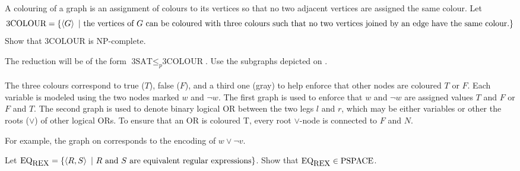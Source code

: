 \documentclass{article}
\begin{document}
\begin{exercise}
A colouring of a graph is an assignment of colours to its vertices so that no two adjacent vertices are assigned the same colour. Let
\begin{equation}
\mbox{3COLOUR}=\left\{ \left\langle G \right\rangle\ |\ \mbox{the vertices of $G$ can be coloured with three colours such that no two vertices joined by an edge have the same colour.} \right\}
\end{equation}
Show that $\mbox{3COLOUR}$ is $\mbox{NP-complete}$.
\begin{hint}
The reduction will be of the form $\mbox{3SAT}\leq_p\mbox{3COLOUR}$. Use the subgraphs depicted on .
\paragraph{}
The three colours correspond to true ($T$), false ($F$), and a third one (gray) to help enforce that other nodes are coloured $T$ or $F$. Each variable is modeled using the two nodes marked $w$ and $\neg w$. The first graph is used to enforce that $w$ and $\neg w$ are assigned values $T$ and $F$ or $F$ and $T$. The second graph is used to denote binary logical OR between the two legs $l$ and $r$, which may be either variables or other the roots ($\vee$) of other logical ORs. To ensure that an OR is coloured T, every root $\vee$-node is connected to $F$ and $N$.
\begin{example}
For example, the graph on  corresponds to the encoding of $w\vee\neg v$.
\end{example}
\end{hint}
\begin{answer}

\end{answer}
\end{exercise}

\begin{exercise}
Let $\mbox{EQ}_{\mbox{\small{REX}}}=\left\{ \left\langle R,S \right\rangle\ |\ \mbox{$R$ and $S$ are equivalent regular expressions} \right\}$. Show that $\mbox{EQ}_{\mbox{\small{REX}}}\in\mbox{PSPACE}$.
\begin{answer}

\end{answer}
\end{exercise}
\end{document}
